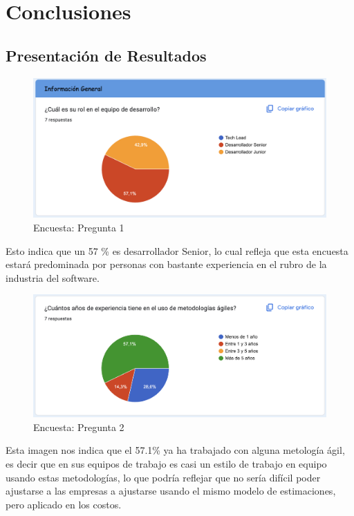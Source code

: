 \chapter{Conclusiones}

\section{Presentación de Resultados}

\begin{figure}[h!]
    \centering
    \includegraphics[width=1\textwidth]{images/question_1.png}
    \caption{Encuesta: Pregunta 1}
    \label{fig:question_1}
\end{figure}

\FloatBarrier

Esto indica que un 57 \% es desarrollador Senior, lo cual refleja que esta encuesta estará predominada por personas con bastante experiencia en el rubro de la industria del software.

\FloatBarrier
\begin{figure}[h!]
    \centering
    \includegraphics[width=1\textwidth]{images/question_2.png}
    \caption{Encuesta: Pregunta 2}
    \label{fig:question_2}
\end{figure}

\FloatBarrier
Esta imagen nos indica que el 57.1\% ya ha trabajado con alguna metología ágil, es decir que en sus equipos de trabajo es casi un estilo de trabajo en equipo usando estas metodologías, lo que podría reflejar que no sería difícil poder ajustarse a las empresas a ajustarse usando el mismo modelo de estimaciones, pero aplicado en los costos.


